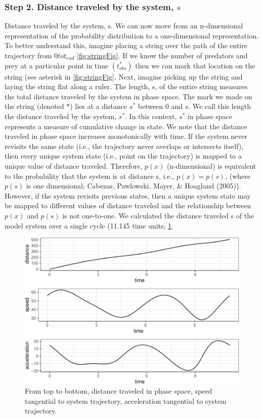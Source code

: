 \documentclass[12pt,twoside,openany]{reedthesis}
\begin{document}
\subsubsection{\texorpdfstring{\textbf{Step 2.} Distance traveled by the
system,
\(s\)}{Step 2. Distance traveled by the system, s}}\label{step-2.-distance-traveled-by-the-system-s}

Distance traveled by the system, s. We can now move from an
n-dimensional representation of the probability distribution to a
one-dimensional representation. To better understand this, imagine
placing a string over the path of the entire trajectory from
\(0 to t_{end}\) \ref{fig:stringFig}. If we know the number of predators
and prey at a particular point in time \((t_{obs}^*)\) then we can mark
that location on the string (see asterisk in \ref{fig:stringFig}. Next,
imagine picking up the string and laying the string flat along a ruler.
The length, s, of the entire string measures the total distance traveled
by the system in phase space. The mark we made on the string (denoted
\(*\)) lies at a distance \(s^*\) between 0 and \(s\). We call this
length the distance traveled by the system, \(s^*\). In this context,
\(s^*\) in phase space represents a measure of cumulative change in
state. We note that the distance traveled in phase space increases
monotonically with time. If the system never revisits the same state
(i.e., the trajectory never overlaps or intersects itself), then every
unique system state (i.e., point on the trajectory) is mapped to a
unique value of distance traveled. Therefore, \(p(x)\) (n-dimensional)
is equivalent to the probability that the system is at distance s, i.e.,
\(p(x)=p(s)\), (where \(p(s)\) is one dimensional; Cabezas, Pawlowski,
Mayer, \& Hoagland (2005)). However, if the system revisits previous
states, then a unique system state may be mapped to different values of
distance traveled and the relationship between \(p(x)\) and \(p(s)\) is
not one-to-one. We calculated the distance traveled s of the model
system over a single cycle (11.145 time units; \ref{fig:distSpeedAccel}.
\begin{figure}

{\centering \includegraphics[width=0.85\linewidth]{_myDissertation_files/figure-latex/distSpeedAccel-1} 

}

\caption{From top to bottom, distance traveled in phase space, speed tangential to system trajectory, acceleration tangential to system trajectory.}\label{fig:distSpeedAccel}
\end{figure}
\end{document}
